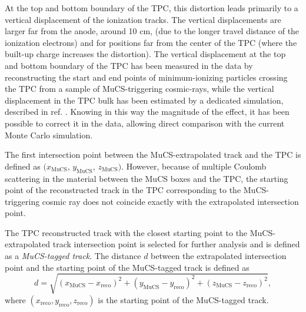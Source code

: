 \documentclass[a4paper,11pt]{article}
\begin{document}
At the top and bottom boundary of the TPC, this distortion leads primarily to a vertical displacement of the ionization tracks. The vertical displacements are larger far from the anode, around 10 cm, (due to the longer travel distance of the ionization electrons) and for positions far from the center of the TPC (where the built-up charge increases the distortion). The vertical displacement at the top and bottom boundary of the TPC has been measured in the data by reconstructing the start and end points of minimum-ionizing particles crossing the TPC from a sample of MuCS-triggering cosmic-rays, while the vertical displacement in the TPC bulk has been estimated by a dedicated simulation, described in ref. \cite{spacecharge}. Knowing in this way the magnitude of the effect, it has been possible to correct it in the data, allowing direct comparison with the current Monte Carlo simulation.

The first intersection point between the MuCS-extrapolated track and the TPC is defined as $(x_{\mathrm{MuCS}}$, $y_{\mathrm{MuCS}}$, $z_{\mathrm{MuCS}})$. However, because of multiple Coulomb scattering in the material between the MuCS boxes and the TPC, the starting point of the reconstructed track in the TPC corresponding to the MuCS-triggering cosmic ray does not coincide exactly with the extrapolated intersection point.

The TPC reconstructed track with the closest starting point to the MuCS-extrapolated track intersection point is selected for further analysis and is defined as a \emph{MuCS-tagged track}.
The distance $d$ between the extrapolated intersection point and the starting point of the MuCS-tagged track is defined as
\begin{equation}\label{eq:d}
d = \sqrt{(x_{\mathrm{MuCS}}-x_{\mathrm{reco}})^2+(y_{\mathrm{MuCS}}-y_{\mathrm{reco}})^2+(z_{\mathrm{MuCS}}-z_{\mathrm{reco}})^2},
\end{equation}
where $(x_{\mathrm{reco}},y_{\mathrm{reco}},z_{\mathrm{reco}})$ is the starting point of the MuCS-tagged track.
\end{document}
